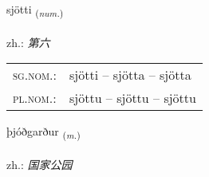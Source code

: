 \documentclass[frontgrid, backgrid]{flacards}\usepackage[]{graphicx}\usepackage[]{xcolor}
\begin{document}
\renewcommand{\flhead}{\vskip5pt \fboxsep=0pt {\small\bfseries\footnotesize Töluorð | 数量词}}
\renewcommand{\fcfoot}{\vskip5pt \fboxsep=0pt \hspace{2pt}{\small\bfseries\footnotesize 3K}}

\renewcommand{\blhead}{\vskip5pt {\small\bfseries\footnotesize Töluorð | 数量词 }}
\renewcommand{\bcfoot}{\vskip5pt \hspace{2pt}{\small\bfseries\footnotesize 3K}}


{sjötti \small{\textsubscript{(\textit{num.})}} \\[1ex] %
\textphonetic{[sjœhtɪ]} \\
zh.: \emph{第六} \\  [2ex]
\renewcommand*{\arraystretch}{0.8}
\begin{tabular}{ll}
\textsc{sg.nom.}: & sjötti  --  sjötta -- sjötta \\ 
\textsc{pl.nom.}: & sjöttu -- sjöttu -- sjöttu
\end{tabular}
}

\renewcommand{\flhead}{\vskip5pt \fboxsep=0pt {\small\bfseries\footnotesize Nafnorð | 名词}}
\renewcommand{\fcfoot}{\vskip5pt \fboxsep=0pt \hspace{2pt}{\small\bfseries\footnotesize 3K}}

\renewcommand{\blhead}{\vskip5pt {\small\bfseries\footnotesize Nafnorð | 名词 }}
\renewcommand{\bcfoot}{\vskip5pt \hspace{2pt}{\small\bfseries\footnotesize 3K}}


{þjóðgarður \small{\textsubscript{(\textit{m.})}} \\[1ex] %
\textphonetic{[θjouðkarðʏr]} \\
zh.: \emph{国家公园} \\  [2ex]
\renewcommand*{\arraystretch}{0.8}
}
\end{document}
